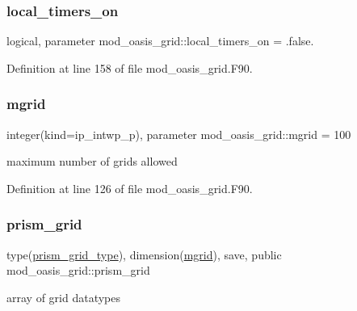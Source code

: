 \subsubsection{\texorpdfstring{local\+\_\+timers\+\_\+on}{local\_timers\_on}}
{\footnotesize\ttfamily logical, parameter mod\+\_\+oasis\+\_\+grid\+::local\+\_\+timers\+\_\+on = .false.\hspace{0.3cm}{\ttfamily [private]}}



Definition at line 158 of file mod\+\_\+oasis\+\_\+grid.\+F90.

\mbox{\label{namespacemod__oasis__grid_a9df267c5d7acbb73eb35d6aaf10ab59e}} 
\subsubsection{\texorpdfstring{mgrid}{mgrid}}
{\footnotesize\ttfamily integer(kind=ip\+\_\+intwp\+\_\+p), parameter mod\+\_\+oasis\+\_\+grid\+::mgrid = 100\hspace{0.3cm}{\ttfamily [private]}}



maximum number of grids allowed 



Definition at line 126 of file mod\+\_\+oasis\+\_\+grid.\+F90.

\mbox{\label{namespacemod__oasis__grid_a43b75282e77fd687bd7173f4f78abcb1}} 
\subsubsection{\texorpdfstring{prism\+\_\+grid}{prism\_grid}}
{\footnotesize\ttfamily type(\hyperlink{structmod__oasis__grid_1_1prism__grid__type}{prism\+\_\+grid\+\_\+type}), dimension(\hyperlink{namespacemod__oasis__grid_a9df267c5d7acbb73eb35d6aaf10ab59e}{mgrid}), save, public mod\+\_\+oasis\+\_\+grid\+::prism\+\_\+grid}



array of grid datatypes 



